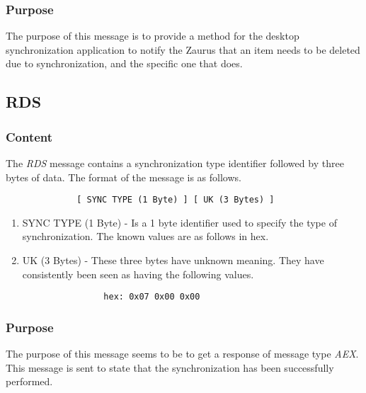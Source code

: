             \subsubsection{Purpose}

            The purpose of this message is to provide a method for the desktop
            synchronization application to notify the Zaurus that an item
            needs to be deleted due to synchronization, and the specific one
            that does.

        \subsection{RDS}

            \subsubsection{Content}

            The \emph{RDS} message contains a synchronization type identifier
            followed by three bytes of data. The format of the message is as
            follows.

            \begin{verbatim}
              [ SYNC TYPE (1 Byte) ] [ UK (3 Bytes) ]
            \end{verbatim}

            \begin{enumerate}
            \item SYNC TYPE (1 Byte) - Is a 1 byte identifier used to specify
              the type of synchronization. The known values are as 
              follows in hex.

              \synctypes

            \item UK (3 Bytes) - These three bytes have unknown meaning. They
              have consistently been seen as having the following values.

              \begin{verbatim}
                hex: 0x07 0x00 0x00
              \end{verbatim}
            \end{enumerate}

            \subsubsection{Purpose}

            The purpose of this message seems to be to get a response of
            message type \emph{AEX}. This message is sent to state that the
            synchronization has been successfully performed.

